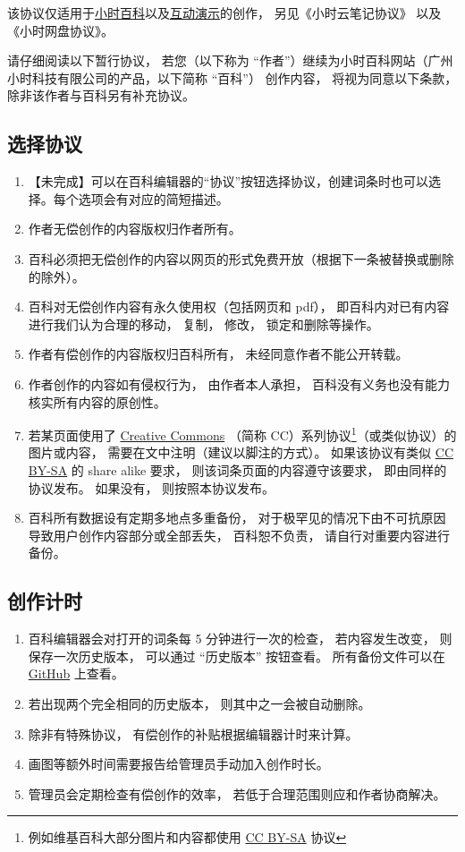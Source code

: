 
该协议仅适用于\href{http://wuli.wiki/online/}{小时百科}以及\href{http://wuli.wiki/apps/}{互动演示}的创作， 另见《小时云笔记协议》 以及《小时网盘协议》。

请仔细阅读以下暂行协议， 若您（以下称为 “作者”）继续为小时百科网站（广州小时科技有限公司的产品，以下简称 “百科”） 创作内容， 将视为同意以下条款， 除非该作者与百科另有补充协议。

\subsection{选择协议}
\begin{enumerate}
\item 【未完成】可以在百科编辑器的“协议”按钮选择协议，创建词条时也可以选择。每个选项会有对应的简短描述。
\item 作者无偿创作的内容版权归作者所有。
\item 百科必须把无偿创作的内容以网页的形式免费开放（根据下一条被替换或删除的除外）。
\item 百科对无偿创作内容有永久使用权（包括网页和 pdf）， 即百科内对已有内容进行我们认为合理的移动， 复制， 修改， 锁定和删除等操作。
\item 作者有偿创作的内容版权归百科所有， 未经同意作者不能公开转载。
\item 作者创作的内容如有侵权行为， 由作者本人承担， 百科没有义务也没有能力核实所有内容的原创性。
\item 若某页面使用了 \href{https://creativecommons.org/licenses/}{Creative Commons} （简称 CC）系列协议\footnote{例如维基百科大部分图片和内容都使用 \href{https://creativecommons.org/licenses/by-sa/3.0/}{CC BY-SA} 协议}（或类似协议）的图片或内容， 需要在文中注明（建议以脚注的方式）。 如果该协议有类似 \href{https://creativecommons.org/licenses/by-sa/3.0/}{CC BY-SA} 的 share alike 要求， 则该词条页面的内容遵守该要求， 即由同样的协议发布。 如果没有， 则按照本协议发布。
\item 百科所有数据设有定期多地点多重备份， 对于极罕见的情况下由不可抗原因导致用户创作内容部分或全部丢失， 百科恕不负责， 请自行对重要内容进行备份。
\end{enumerate}

\subsection{创作计时}
\begin{enumerate}
\item 百科编辑器会对打开的词条每 5 分钟进行一次的检查， 若内容发生改变， 则保存一次历史版本， 可以通过 “历史版本” 按钮查看。 所有备份文件可以在 \href{https://github.com/MacroUniverse/PhysWiki-backup}{GitHub} 上查看。
\item 若出现两个完全相同的历史版本， 则其中之一会被自动删除。
\item 除非有特殊协议， 有偿创作的补贴根据编辑器计时来计算。
\item 画图等额外时间需要报告给管理员手动加入创作时长。
\item 管理员会定期检查有偿创作的效率， 若低于合理范围则应和作者协商解决。
\end{enumerate}

